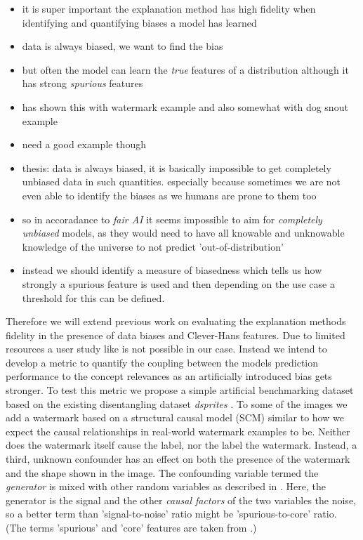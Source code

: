 \begin{itemize}
    \item it is super important the explanation method has high fidelity when identifying and quantifying biases a model has learned
    \item data is always biased, we want to find the bias
    \item but often the model can learn the \textit{true} features of a distribution although it has strong \textit{spurious} features 
    \item \cite{Achtibat2022} has shown this with watermark example and also somewhat with dog snout example
    \item need a good example though
    \item thesis: data is always biased, it is basically impossible to get completely unbiased data in such quantities. especially because sometimes we are not even able to identify the biases as we humans are prone to them too
    \item so in accoradance to \textit{fair AI} it seems impossible to aim for \textit{completely unbiased} models, as they would need to have all knowable and unknowable knowledge of the universe to not predict 'out-of-distribution' 
    \item instead we should identify a measure of biasedness which tells us how strongly a spurious feature is used and then depending on the use case a threshold for this can be defined.
\end{itemize}

Therefore we will extend previous work on evaluating the explanation methods fidelity in the presence of data biases and Clever-Hans features. Due to limited resources a user study like \cite{Sixt2022} is not possible in our case. Instead we intend to develop a metric to quantify the coupling between the models prediction performance to the concept relevances as an artificially introduced bias gets stronger. To test this metric we propose a simple artificial benchmarking dataset based on the existing disentangling dataset \textit{dsprites} \cite{dsprites17}. To some of the images we add a watermark based on a structural causal model (SCM) similar to how we expect the causal relationships in real-world watermark examples to be. Neither does the watermark itself cause the label, nor the label the watermark. Instead, a third, unknown confounder has an effect on both the presence of the watermark and the shape shown in the image. The confounding variable termed the \textit{generator} is mixed with other random variables as described in \cite{Clark2023}. Here, the generator is the signal and the other \textit{causal factors} of the two variables the noise, so a better term than 'signal-to-noise' ratio might be 'spurious-to-core' ratio.
(The terms 'spurious' and 'core' features are taken from \cite{Singla2022}.) 

